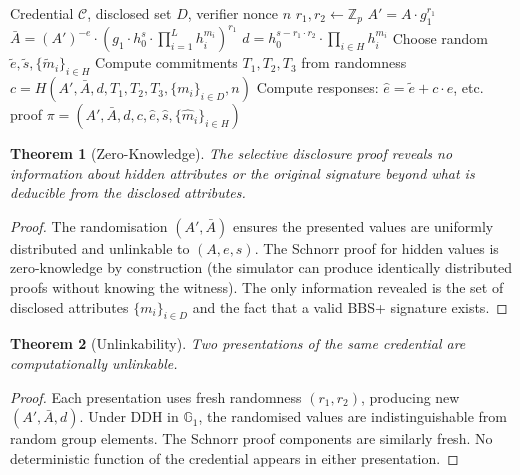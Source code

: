 \documentclass[11pt,a4paper]{article}
\newtheorem{theorem}{Theorem}[section]
\begin{document}
\begin{algorithm}[H]
\caption{Selective Disclosure Presentation}
\label{alg:present}
\begin{algorithmic}[1]
\Require Credential $\mathcal{C}$, disclosed set $D$, verifier nonce $n$
\State {}
\State $r_1, r_2 \leftarrow \mathbb{Z}_p$
\State $A' = A \cdot g_1^{r_1}$
\State $\bar{A} = (A')^{-e} \cdot (g_1 \cdot h_0^s \cdot
    \prod_{i=1}^{L} h_i^{m_i})^{r_1}$
\State $d = h_0^{s - r_1 \cdot r_2} \cdot
    \prod_{i \in H} h_i^{m_i}$
\State
\State {}
\State Choose random $\tilde{e}, \tilde{s}, \{\tilde{m}_i\}_{i \in H}$
\State Compute commitments $T_1, T_2, T_3$ from randomness
\State $c = H(A', \bar{A}, d, T_1, T_2, T_3,
    \{m_i\}_{i \in D}, n)$
\State Compute responses: $\hat{e} = \tilde{e} + c \cdot e$, etc.
\State
\State \Return proof $\pi = (A', \bar{A}, d, c,
    \hat{e}, \hat{s}, \{\hat{m}_i\}_{i \in H})$
\end{algorithmic}
\end{algorithm}

\begin{theorem}[Zero-Knowledge]
    The selective disclosure proof reveals no information about hidden
    attributes or the original signature beyond what is deducible from
    the disclosed attributes.
\end{theorem}

\begin{proof}
    The randomisation $(A', \bar{A})$ ensures the presented values are
    uniformly distributed and unlinkable to $(A, e, s)$.  The Schnorr
    proof for hidden values is zero-knowledge by construction (the
    simulator can produce identically distributed proofs without knowing
    the witness).  The only information revealed is the set of disclosed
    attributes $\{m_i\}_{i \in D}$ and the fact that a valid BBS+
    signature exists.
\end{proof}

\begin{theorem}[Unlinkability]
    Two presentations of the same credential are computationally
    unlinkable.
\end{theorem}

\begin{proof}
    Each presentation uses fresh randomness $(r_1, r_2)$, producing new
    $(A', \bar{A}, d)$.  Under DDH in $\mathbb{G}_1$, the randomised
    values are indistinguishable from random group elements.  The Schnorr
    proof components are similarly fresh.  No deterministic function of
    the credential appears in either presentation.
\end{proof}
\end{document}
